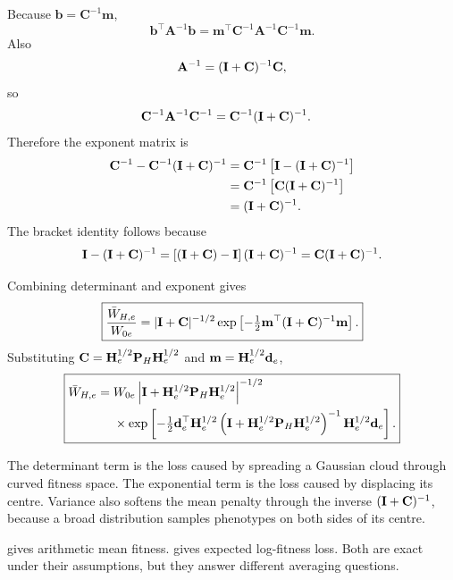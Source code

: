 Because \(\mathbf b=\mathbf C^{-1}\mathbf m\),
\begin{equation}
\mathbf b^\top\mathbf A^{-1}\mathbf b
=\mathbf m^\top\mathbf C^{-1}\mathbf A^{-1}\mathbf C^{-1}\mathbf m.
\end{equation}
Also
\begin{equation}
\mathbf A^{-1}=(\mathbf{I}+\mathbf C)^{-1}\mathbf C,
\end{equation}
so
\begin{align}
\mathbf C^{-1}\mathbf A^{-1}\mathbf C^{-1}
&=\mathbf C^{-1}(\mathbf{I}+\mathbf C)^{-1}.
\end{align}
Therefore the exponent matrix is
\begin{align}
\mathbf C^{-1}-\mathbf C^{-1}(\mathbf{I}+\mathbf C)^{-1}
&=\mathbf C^{-1}\left[\mathbf{I}-(\mathbf{I}+\mathbf C)^{-1}\right]\\
&=\mathbf C^{-1}\left[\mathbf C(\mathbf{I}+\mathbf C)^{-1}\right]\\
&=(\mathbf{I}+\mathbf C)^{-1}.
\end{align}
The bracket identity follows because
\begin{equation}
\mathbf{I}-(\mathbf{I}+\mathbf C)^{-1}
=\left[(\mathbf{I}+\mathbf C)-\mathbf{I}\right](\mathbf{I}+\mathbf C)^{-1}
=\mathbf C(\mathbf{I}+\mathbf C)^{-1}.
\end{equation}

Combining determinant and exponent gives
\begin{equation}
\boxed{
\frac{\bar W_{H,e}}{W_{0e}}
=|\mathbf{I}+\mathbf C|^{-1/2}
\exp\left[-\tfrac12\mathbf m^\top(\mathbf{I}+\mathbf C)^{-1}\mathbf m\right].}
\label{eq:GaussianFitnessCompact}
\end{equation}
Substituting \(\mathbf C=\mathbf{H}_e^{1/2}\mathbf{P}_H\mathbf{H}_e^{1/2}\) and \(\mathbf m=\mathbf{H}_e^{1/2}\mathbf d_e\),
\begin{equation}
\boxed{
\begin{aligned}
\bar W_{H,e}
={}&W_{0e}
\left|\mathbf{I}+\mathbf{H}_e^{1/2}\mathbf{P}_H\mathbf{H}_e^{1/2}\right|^{-1/2}\\
&\times
\exp\left[
-\tfrac12\mathbf d_e^\top\mathbf{H}_e^{1/2}
\left(\mathbf{I}+\mathbf{H}_e^{1/2}\mathbf{P}_H\mathbf{H}_e^{1/2}\right)^{-1}
\mathbf{H}_e^{1/2}\mathbf d_e
\right].
\end{aligned}}
\label{eq:exactGaussianMeanFitness}
\end{equation}

\begin{geombox}
The determinant term is the loss caused by spreading a Gaussian cloud through curved fitness space. The exponential term is the loss caused by displacing its centre. Variance also softens the mean penalty through the inverse \((\mathbf{I}+\mathbf C)^{-1}\), because a broad distribution samples phenotypes on both sides of its centre.
\end{geombox}

\begin{cautionbox}
 gives arithmetic mean fitness.  gives expected log-fitness loss. Both are exact under their assumptions, but they answer different averaging questions.
\end{cautionbox}
